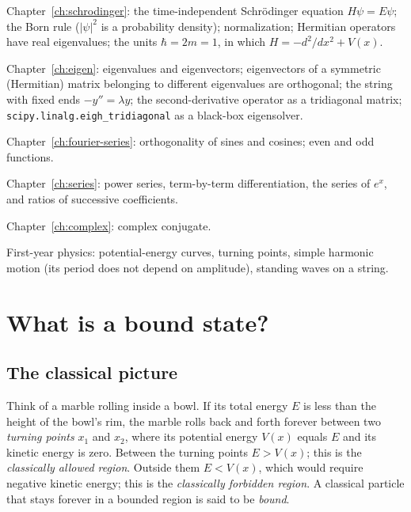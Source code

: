 \begin{prerequisites}
\item Chapter~\ref{ch:schrodinger}: the time-independent Schr\"odinger equation $H\psi=E\psi$; the Born rule ($|\psi|^2$ is a probability density); normalization; Hermitian operators have real eigenvalues; the units $\hbar=2m=1$, in which $H=-d^2/dx^2+V(x)$.
\item Chapter~\ref{ch:eigen}: eigenvalues and eigenvectors; eigenvectors of a symmetric (Hermitian) matrix belonging to different eigenvalues are orthogonal; the string with fixed ends $-y''=\lambda y$; the second-derivative operator as a tridiagonal matrix; \texttt{scipy.linalg.eigh\_tridiagonal} as a black-box eigensolver.
\item Chapter~\ref{ch:fourier-series}: orthogonality of sines and cosines; even and odd functions.
\item Chapter~\ref{ch:series}: power series, term-by-term differentiation, the series of $e^x$, and ratios of successive coefficients.
\item Chapter~\ref{ch:complex}: complex conjugate.
\item First-year physics: potential-energy curves, turning points, simple harmonic motion (its period does not depend on amplitude), standing waves on a string.
\end{prerequisites}

\section{What is a bound state?}\label{sec:bound-states-what}

\subsection{The classical picture}

Think of a marble rolling inside a bowl. If its total energy $E$ is less than the height of the bowl's rim, the marble rolls back and forth forever between two \emph{turning points} $x_1$ and $x_2$, where its potential energy $V(x)$ equals $E$ and its kinetic energy is zero. Between the turning points $E>V(x)$; this is the \emph{classically allowed region}. Outside them $E<V(x)$, which would require negative kinetic energy; this is the \emph{classically forbidden region}. A classical particle that stays forever in a bounded region is said to be \emph{bound}.

